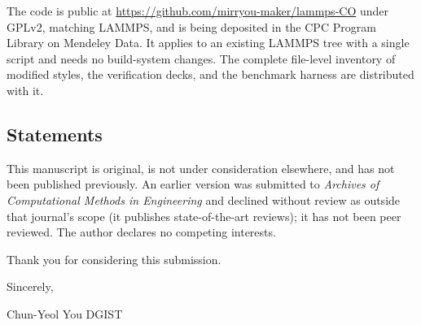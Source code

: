 \documentclass[
  11pt,
]{article}
\begin{document}
The code is public at \url{https://github.com/mirryou-maker/lammps-CO}
under GPLv2, matching LAMMPS, and is being deposited in the CPC Program
Library on Mendeley Data. It applies to an existing LAMMPS tree with a
single script and needs no build-system changes. The complete file-level
inventory of modified styles, the verification decks, and the benchmark
harness are distributed with it.

\subsection{Statements}\label{statements}

This manuscript is original, is not under consideration elsewhere, and
has not been published previously. An earlier version was submitted to
\emph{Archives of Computational Methods in Engineering} and declined
without review as outside that journal's scope (it publishes
state-of-the-art reviews); it has not been peer reviewed. The author
declares no competing interests.

Thank you for considering this submission.

Sincerely,

Chun-Yeol You DGIST
\end{document}

